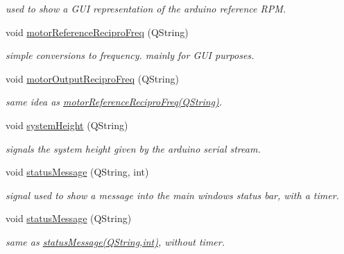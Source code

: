 \begin{DoxyCompactItemize}
\begin{DoxyCompactList}\small\item\em used to show a G\+U\+I representation of the arduino reference R\+P\+M. \end{DoxyCompactList}\item 
void \hyperlink{class_main_window_a6c2597367d4174eb49edf2b8f2ecee54}{motor\+Reference\+Recipro\+Freq} (Q\+String)
\begin{DoxyCompactList}\small\item\em simple conversions to frequency. mainly for G\+U\+I purposes. \end{DoxyCompactList}\item 
void \hyperlink{class_main_window_a58e84e8e07511b10f54d838f9b7738a9}{motor\+Output\+Recipro\+Freq} (Q\+String)
\begin{DoxyCompactList}\small\item\em same idea as \hyperlink{class_main_window_a6c2597367d4174eb49edf2b8f2ecee54}{motor\+Reference\+Recipro\+Freq(\+Q\+String)}. \end{DoxyCompactList}\item 
\hypertarget{class_main_window_ae183b93234b45eec5f45ec2d25aceade}{void \hyperlink{class_main_window_ae183b93234b45eec5f45ec2d25aceade}{system\+Height} (Q\+String)}\label{class_main_window_ae183b93234b45eec5f45ec2d25aceade}

\begin{DoxyCompactList}\small\item\em signals the system height given by the arduino serial stream. \end{DoxyCompactList}\item 
\hypertarget{class_main_window_a9394ce562d6dc149df191ec48d1d7d3c}{void \hyperlink{class_main_window_a9394ce562d6dc149df191ec48d1d7d3c}{status\+Message} (Q\+String, int)}\label{class_main_window_a9394ce562d6dc149df191ec48d1d7d3c}

\begin{DoxyCompactList}\small\item\em signal used to show a message into the main windows status bar, with a timer. \end{DoxyCompactList}\item 
\hypertarget{class_main_window_a3ab48045303237d00e9767873f811134}{void \hyperlink{class_main_window_a3ab48045303237d00e9767873f811134}{status\+Message} (Q\+String)}\label{class_main_window_a3ab48045303237d00e9767873f811134}

\begin{DoxyCompactList}\small\item\em same as \hyperlink{class_main_window_a9394ce562d6dc149df191ec48d1d7d3c}{status\+Message(\+Q\+String,int)}, without timer. \end{DoxyCompactList}\end{DoxyCompactItemize}
